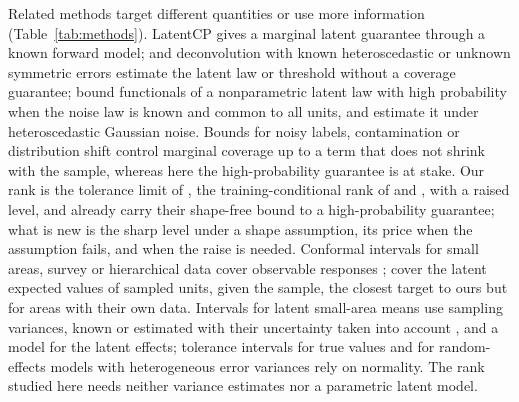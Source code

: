 \documentclass[12pt]{article}
\theoremstyle{definition}
\begin{document}
Related methods target different quantities or use more information (Table~\ref{tab:methods}). LatentCP \citep*{zheng2026} gives a marginal latent guarantee through a known forward model; \citet*{cohen2025} and deconvolution with known heteroscedastic or unknown symmetric errors \citep{delaigle2008, delaigle2016} estimate the latent law or threshold without a coverage guarantee; \citet*{ignatiadis2022} bound functionals of a nonparametric latent law with high probability when the noise law is known and common to all units, and \citet*{soloff2025} estimate it under heteroscedastic Gaussian noise. Bounds for noisy labels, contamination or distribution shift \citep*{sesia2025, penso2025, clarkson2024, barber2023, cauchois2024, feldman2026} control marginal coverage up to a term that does not shrink with the sample, whereas here the high-probability guarantee is at stake. Our rank is the tolerance limit of \citet{wilks1941}, the training-conditional rank of \citet{vovk2012} and \citet{bian2023}, with a raised level, and \citet[Appendix~C.3]{guille2024} already carry their shape-free bound to a high-probability guarantee; what is new is the sharp level under a shape assumption, its price when the assumption fails, and when the raise is needed. Conformal intervals for small areas, survey or hierarchical data cover observable responses \citep{bersson2024, wieczorek2023, dunn2023}; \citet{zhang2026} cover the latent expected values of sampled units, given the sample, the closest target to ours but for areas with their own data. Intervals for latent small-area means \citep{yu2018, burris2020, diao2014, yoshimori2014, hallmaiti2006, chatterjee2008, armstrong2022} use sampling variances, known or estimated with their uncertainty taken into account \citep{wangfuller2003, you2006, dass2012}, and a model for the latent effects; tolerance intervals for true values \citep{wang1994} and for random-effects models with heterogeneous error variances \citep{liao2005, lin2008} rely on normality. The rank studied here needs neither variance estimates nor a parametric latent model.
\end{document}
